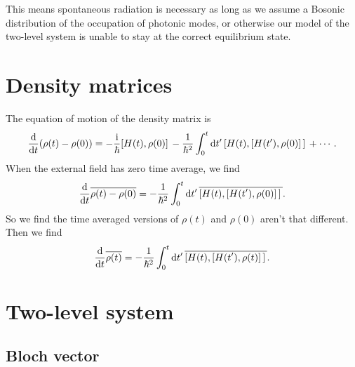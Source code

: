 \documentclass[hyperref, a4paper]{article}
\newcommand*{\ii}{\mathrm{i}}
\begin{document}
This means spontaneous radiation is necessary
as long as we assume a Bosonic distribution 
of the occupation of photonic modes, 
or otherwise our model of the two-level system is unable to 
stay at the correct equilibrium state. 

\section{Density matrices}

The equation of motion of the density matrix is 
\begin{equation}
    \dv{t} (\rho(t) - \rho(0))
    = - \frac{\ii}{\hbar} \comm*{H(t)}{\rho(0)} 
    - \frac{1}{\hbar^2} \int_{0}^{t} \dd{t'} \comm*{H(t)}{\comm*{H(t')}{\rho(0)}} + \cdots.
\end{equation}
When the external field has zero time average, 
we find 
\[
    \dv{t} \overline{
        \rho(t) - \rho(0)
    } = - \frac{1}{\hbar^2} \int_{0}^{t} \dd{t'} 
    \overline{\comm*{H(t)}{\comm*{H(t')}{\rho(0)}}}.
\]
So we find the time averaged versions of $\rho(t)$ and $\rho(0)$ aren't that different.
Then we find 
\begin{equation}
    \dv{t} \overline{\rho(t)} = - \frac{1}{\hbar^2} \int_{0}^{t} \dd{t'} 
    \overline{\comm*{H(t)}{\comm*{H(t')}{\rho(t)}}}.
\end{equation}





\section{Two-level system}

\subsection{Bloch vector}
\end{document}
